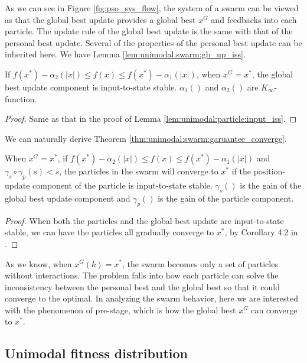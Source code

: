 As we can see in Figure \ref{fig:pso_sys_flow}, the system of a swarm can be viewed as that the global best update provides a global best $ x^{G} $ and feedbacks into each particle.
The update rule of the global best update is the same with that of the personal best update.
Several of the properties of the personal best update can be inherited here.
We have Lemma \ref{lem:unimodal:swarm:gb_up_iss}.

\begin{mylem}
\label{lem:unimodal:swarm:gb_up_iss}
If $ f(x^{*}) - \alpha_{2} ( |x| ) \leq  f(x) \leq f(x^{*}) - \alpha_{1} ( |x| ) $, when $ x^{G} = x^{*} $, the global best update component is input-to-state stable.
$ \alpha_{1} () $ and $ \alpha_{2} () $ are $ K_{\infty} $-function.
\begin{proof}
Same as that in the proof of Lemma \ref{lem:unimodal:particle:input_iss}.
\end{proof}
\end{mylem}

We can naturally derive Theorem \ref{thm:unimodal:swarm:garuantee_converge}.

\begin{mythm}
\label{thm:unimodal:swarm:garuantee_converge}
When $ x^{G} = x^{*} $,  if $ f(x^{*}) - \alpha_{2} ( |x| ) \leq  f(x) \leq f(x^{*}) - \alpha_{1} ( |x| ) $ and $ \gamma_{s} \circ \gamma_{p} (s)  < s $, the particles in the swarm will converge to $ x^{*} $ if the position-update component of the particle is input-to-state stable.
$ \gamma_{s} () $ is the gain of the global best update component and $ \gamma_{p} () $ is the gain of the particle component.
\begin{proof}
When both the particles and the global best update are input-to-state stable, we can have the particles all gradually converge to $ x^{*} $, by Corollary 4.2 in \cite{Jiang2001857}.
\end{proof}
\end{mythm}

As we know, when $ x^{G}(k) = x^{*} $, the swarm becomes only a set of particles without interactions.
The problem falls into how each particle can solve the inconsistency between the personal best and the global best so that it could converge to the optimal.
In analyzing the swarm behavior, here we are interested with the phenomenon of pre-stage, which is how the global best $ x^{G} $ can converge to $ x^{*} $.

\subsection{Unimodal fitness distribution}

